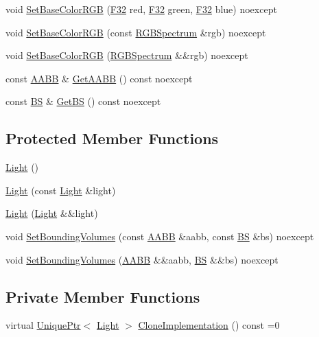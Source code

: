 \begin{DoxyCompactItemize}
\item 
void \hyperlink{classmage_1_1_light_ae3be2fc78d76f46e85b3deaf949eea87}{Set\+Base\+Color\+R\+GB} (\hyperlink{namespacemage_aa97e833b45f06d60a0a9c4fc22ae02c0}{F32} red, \hyperlink{namespacemage_aa97e833b45f06d60a0a9c4fc22ae02c0}{F32} green, \hyperlink{namespacemage_aa97e833b45f06d60a0a9c4fc22ae02c0}{F32} blue) noexcept
\item 
void \hyperlink{classmage_1_1_light_aa31931f2c3e77602dbedfda2891b2b39}{Set\+Base\+Color\+R\+GB} (const \hyperlink{structmage_1_1_r_g_b_spectrum}{R\+G\+B\+Spectrum} \&rgb) noexcept
\item 
void \hyperlink{classmage_1_1_light_afee8d91967e9c6d3df9c48ba070a8ed0}{Set\+Base\+Color\+R\+GB} (\hyperlink{structmage_1_1_r_g_b_spectrum}{R\+G\+B\+Spectrum} \&\&rgb) noexcept
\item 
const \hyperlink{structmage_1_1_a_a_b_b}{A\+A\+BB} \& \hyperlink{classmage_1_1_light_a1ce1d4a97857b182e629e0e546beb280}{Get\+A\+A\+BB} () const noexcept
\item 
const \hyperlink{structmage_1_1_b_s}{BS} \& \hyperlink{classmage_1_1_light_ab2365a76f8f3a2ae2c97263ea556a993}{Get\+BS} () const noexcept
\end{DoxyCompactItemize}
\subsection*{Protected Member Functions}
\begin{DoxyCompactItemize}
\item 
\hyperlink{classmage_1_1_light_a5c1b256aef7e22faafcce7ea2fa8f858}{Light} ()
\item 
\hyperlink{classmage_1_1_light_aa91ba3fde50487939d99252c73f732cc}{Light} (const \hyperlink{classmage_1_1_light}{Light} \&light)
\item 
\hyperlink{classmage_1_1_light_a75343c11264fa27c4f166caaf0fec880}{Light} (\hyperlink{classmage_1_1_light}{Light} \&\&light)
\item 
void \hyperlink{classmage_1_1_light_aa4ec2f7e3e42804aad415a03075c4b39}{Set\+Bounding\+Volumes} (const \hyperlink{structmage_1_1_a_a_b_b}{A\+A\+BB} \&aabb, const \hyperlink{structmage_1_1_b_s}{BS} \&bs) noexcept
\item 
void \hyperlink{classmage_1_1_light_a8ca9ffda51c5f32eb940680ceb795f0f}{Set\+Bounding\+Volumes} (\hyperlink{structmage_1_1_a_a_b_b}{A\+A\+BB} \&\&aabb, \hyperlink{structmage_1_1_b_s}{BS} \&\&bs) noexcept
\end{DoxyCompactItemize}
\subsection*{Private Member Functions}
\begin{DoxyCompactItemize}
\item 
virtual \hyperlink{namespacemage_a3316d7143a973e37adf1110f2e80ca31}{Unique\+Ptr}$<$ \hyperlink{classmage_1_1_light}{Light} $>$ \hyperlink{classmage_1_1_light_aa613d76a1ebda69efde853d15f75490c}{Clone\+Implementation} () const =0
\end{DoxyCompactItemize}
